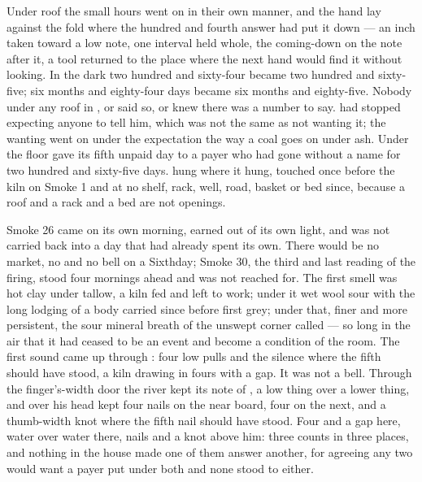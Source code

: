 
Under  roof the small hours went on in their own manner, and the hand lay against the fold where the hundred and fourth answer had put it down --- an inch taken toward a low note, one interval held whole, the coming-down on the note after it, a tool returned to the place where the next hand would find it without looking. In the dark two hundred and sixty-four became two hundred and sixty-five; six months and eighty-four days became six months and eighty-five. Nobody under any roof in ,  or  said so, or knew there was a number to say.  had stopped expecting anyone to tell him, which was not the same as not wanting it; the wanting went on under the expectation the way a coal goes on under ash. Under the floor  gave its fifth unpaid day to a payer who had gone without a name for two hundred and sixty-five days.  hung where it hung, touched once before the kiln on Smoke 1 and at no shelf, rack, well, road, basket or bed since, because a roof and a rack and a bed are not openings.

Smoke 26 came on its own morning, earned out of its own light, and was not carried back into a day that had already spent its own. There would be no market, no  and no bell on a Sixthday; Smoke 30, the third and last reading of the firing, stood four mornings ahead and was not reached for. The first smell was hot clay under tallow, a kiln fed and left to work; under it wet wool sour with the long lodging of a body carried since before first grey; under that, finer and more persistent, the sour mineral breath of the unswept corner called  ---  so long in the air that it had ceased to be an event and become a condition of the room. The first sound came up through : four low pulls and the silence where the fifth should have stood, a kiln drawing in fours with a gap. It was not a bell. Through the finger's-width door the river kept its note of , a low thing over a lower thing, and over his head  kept four nails on the near board, four on the next, and a thumb-width knot where the fifth nail should have stood. Four and a gap here, water over water there, nails and a knot above him: three counts in three places, and nothing in the house made one of them answer another, for agreeing any two would want a payer put under both and none stood to either.

